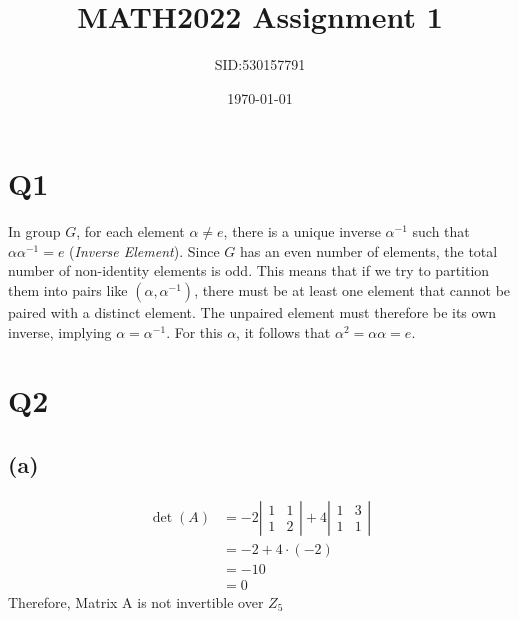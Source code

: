 \documentclass[12pt]{article}
\title{MATH2022 Assignment 1}
\author{SID:530157791}
\date{\today}
\begin{document}
\maketitle

\section{Q1}
	In group $G$, for each element $\alpha \neq e$, there is a unique inverse $\alpha^{-1}$ such that $\alpha \alpha^{-1} = e$ (\textit{Inverse Element}). Since $G$ has an even number of elements, the total number of non-identity elements is odd. This means that if we try to partition them into pairs like $(\alpha,\alpha^{-1})$, there must be at least one element that cannot be paired with a distinct element. The unpaired element must therefore be its own inverse, implying $\alpha = \alpha^{-1}$. For this $\alpha$, it follows that $\alpha^2 = \alpha \alpha = e$.

\section{Q2}
	\subsection*{(a)}
		$$
		\begin{aligned}
		\operatorname{det}(A) & =-2\left|\begin{array}{ll}
		1 & 1 \\
		1 & 2
		\end{array}\right|+4\left|\begin{array}{ll}
		1 & 3 \\
		1 & 1
		\end{array}\right| \\
		& =-2+4 \cdot(-2) \\
		& =-10 \\
		& =0 
		\end{aligned}
		$$
		Therefore, Matrix A is not invertible over $Z_5$
\end{document}
